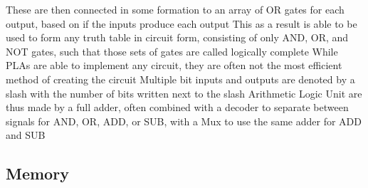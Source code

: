 \documentclass[11 pt, twoside]{article}
\newenvironment{outline*}
{
	\begin{outline}[enumerate]
	}
	{\end{outline}
}
\begin{document}
\begin{outline*}
\3 These are then connected in some formation to an array of OR gates for each output, based on if the inputs produce each output
\3 This as a result is able to be used to form any truth table in circuit form, consisting of only AND, OR, and NOT gates, such that those sets of gates are called logically complete
\3 While PLAs are able to implement any circuit, they are often not the most efficient method of creating the circuit
\3 Multiple bit inputs and outputs are denoted by a slash with the number of bits written next to the slash
\2 Arithmetic Logic Unit are thus made by a full adder, often combined with a decoder to separate between signals for AND, OR, ADD, or SUB, with a Mux to use the same adder for ADD and SUB
\end{outline*}
\subsection{Memory}
\end{document}
